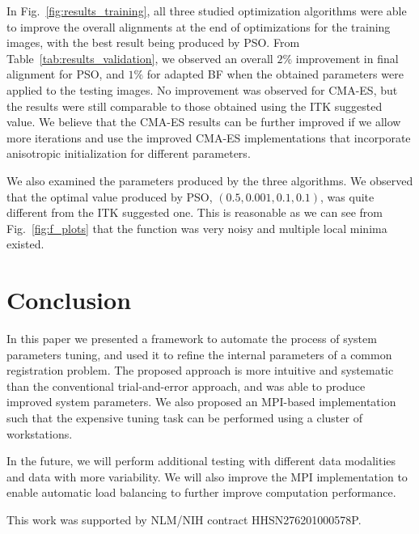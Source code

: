 \documentclass[]{spie}  %
\begin{document}
In Fig.~\ref{fig:results_training}, all three studied optimization algorithms were able to improve the overall alignments at the end of optimizations for the training images, with the best result being produced by PSO.
From Table~\ref{tab:results_validation}, we observed an overall $2\%$ improvement in final alignment for PSO, and $1\%$ for adapted BF when the obtained parameters were applied to the testing images. No improvement was observed for CMA-ES, but the results were still comparable to those obtained using the ITK suggested value. We believe that the CMA-ES results can be further improved if we allow more iterations and use the improved CMA-ES implementations that incorporate anisotropic initialization for different parameters.

We also examined the parameters produced by the three algorithms. We observed that the optimal value produced by PSO, $(0.5, 0.001, 0.1, 0.1)$, was quite different from the ITK suggested one. This is reasonable as we can see from Fig.~\ref{fig:f_plots} that the function was very noisy and multiple local minima existed.

\section{Conclusion}

In this paper we presented a framework to automate the process of system parameters tuning, and used it to refine the internal parameters of a common registration problem. The proposed approach is more intuitive and systematic than the conventional trial-and-error approach, and was able to produce improved system parameters. We also proposed an MPI-based implementation such that the expensive tuning task can be performed using a cluster of workstations.

In the future, we will perform additional testing with different data modalities and data with more variability. We will also improve the MPI implementation to enable automatic load balancing to further improve computation performance.

\acknowledgments     %
 
This work was supported by NLM/NIH contract HHSN276201000578P. 


\end{document}
